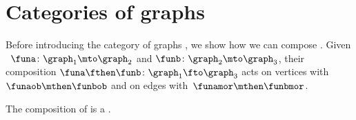 
\section[Categories of graphs]{Categories of graphs}
\label{sec:cat-grph}

Before introducing the category of graphs \Grph, we show how we can compose .
Given ~$\funa\colon \graph_1\mto \graph_2$ and $\funb\colon \graph_2\mto \graph_3$, their composition $\funa\fthen \funb \colon \graph_1 \fto \graph_3$ acts on vertices with~$\funaob \mthen \funbob$ and on edges with~$\funamor \mthen \funbmor$.

\begin{lemma}
    \label{lem:composing_homomorphisms}
    The composition of  is a .
\end{lemma}
%
